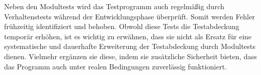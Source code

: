 Neben den Modultests wird das Testprogramm auch regelmäßig durch Verhaltenstests während der Entwicklungsphase überprüft. Somit werden Fehler frühzeitig identifiziert und behoben. 
Obwohl diese Tests die Testabdeckung temporär erhöhen, ist es wichtig zu erwähnen, dass sie nicht als Ersatz für eine systematische und dauerhafte Erweiterung der Testabdeckung durch 
Modultests dienen. Vielmehr ergänzen sie diese, indem sie zusätzliche Sicherheit bieten, dass das Programm auch unter realen Bedingungen zuverlässig funktioniert.
